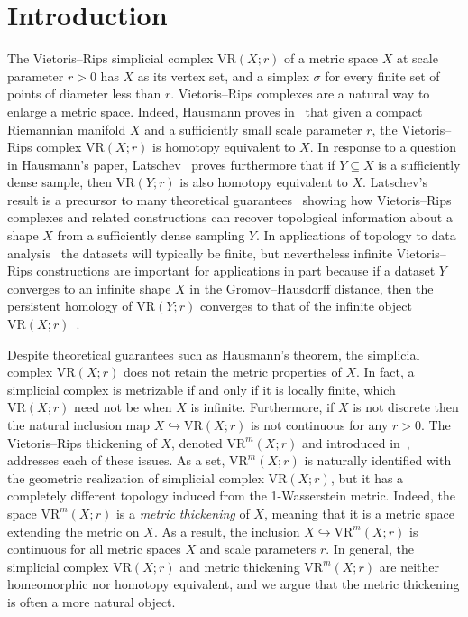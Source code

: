 \documentclass{amsart}
\theoremstyle{plain}
\theoremstyle{definition}
\theoremstyle{myremark}
\newcommand{\inj}{\hookrightarrow}     %
\newcommand{\vr}[2]{\mathrm{VR}(#1;#2)}
\newcommand{\vrm}[2]{\mathrm{VR}^m(#1;#2)}
\begin{document}
\section{Introduction}

The Vietoris--Rips simplicial complex $\vr{X}{r}$ of a metric space $X$ at scale parameter $r > 0$ has $X$ as its vertex set, and a simplex $\sigma$ for every finite set of points of diameter less than $r$.
Vietoris--Rips complexes are a natural way to enlarge a metric space. 
Indeed, Hausmann proves in~\cite{Hausmann} that given a compact Riemannian manifold $X$ and a sufficiently small scale parameter $r$, the Vietoris--Rips complex $\vr{X}{r}$ is homotopy equivalent to $X$.
In response to a question in Hausmann's paper, Latschev~\cite{Latschev} proves furthermore that if $Y \subseteq X$ is a sufficiently dense sample, then $\vr{Y}{r}$ is also homotopy equivalent to $X$.
Latschev's result is a precursor to many theoretical guarantees~\cite{AFV,AttaliLieutier,ChazalDeSilvaOudot2013,ChazalOudot2008,NiyogiSmaleWeinberger} showing how Vietoris--Rips complexes and related constructions can recover topological information about a shape $X$ from a sufficiently dense sampling $Y$.
In applications of topology to data analysis~\cite{Carlsson2009,EdelsbrunnerHarer} the datasets will typically be finite, but nevertheless infinite Vietoris--Rips constructions are important for applications in part because if a dataset $Y$ converges to an infinite shape $X$ in the Gromov--Hausdorff distance, then the persistent homology of $\vr{Y}{r}$ converges to that of the infinite object $\vr{X}{r}$~\cite{ChazalDeSilvaOudot2013}.

Despite theoretical guarantees such as Hausmann's theorem, the simplicial complex $\vr{X}{r}$ does not retain the metric properties of $X$.
In fact, a simplicial complex is metrizable if and only if it is locally finite, which $\vr{X}{r}$ need not be when $X$ is infinite.
Furthermore, if $X$ is not discrete then the natural inclusion map $X \inj \vr{X}{r}$ is not continuous for any $r>0$. 
The Vietoris--Rips thickening of $X$, denoted $\vrm{X}{r}$ and introduced in~\cite{MetricReconstructionViaOptimalTransport}, addresses each of these issues.
As a set, $\vrm{X}{r}$ is naturally identified with the geometric realization of simplicial complex $\vr{X}{r}$, but it has a completely different topology induced from the 1-Wasserstein metric.
Indeed, the space $\vrm{X}{r}$ is a \emph{metric thickening} of $X$, meaning that it is a metric space extending the metric on $X$.
As a result, the inclusion $X \inj \vrm{X}{r}$ is continuous for all metric spaces $X$ and scale parameters $r$.
In general, the simplicial complex $\vr{X}{r}$ and metric thickening $\vrm{X}{r}$ are neither homeomorphic nor homotopy equivalent, and we argue that the metric thickening is often a more natural object.
\end{document}
